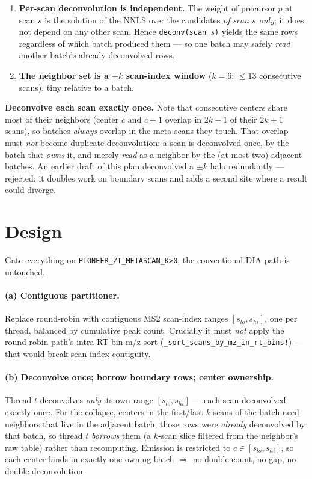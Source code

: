\documentclass[11pt]{article}
\newcommand{\code}[1]{\texttt{\small #1}}
\begin{document}
\begin{enumerate}[nosep]
  \item \textbf{Per-scan deconvolution is independent.} The weight of precursor $p$ at
    scan $s$ is the solution of the NNLS over the candidates \emph{of scan $s$ only};
    it does not depend on any other scan. Hence \code{deconv(scan $s$)} yields the same
    rows regardless of which batch produced them --- so one batch may safely \emph{read}
    another batch's already-deconvolved rows.
  \item \textbf{The neighbor set is a $\pm k$ scan-index window} ($k=6$; $\le 13$
    consecutive scans), tiny relative to a batch.
\end{enumerate}

\medskip\noindent\textbf{Deconvolve each scan exactly once.} Note that consecutive centers
share most of their neighbors (center $c$ and $c{+}1$ overlap in $2k{-}1$ of their $2k{+}1$
scans), so batches \emph{always} overlap in the meta-scans they touch. That overlap must
\emph{not} become duplicate deconvolution: a scan is deconvolved once, by the batch that
\emph{owns} it, and merely \emph{read} as a neighbor by the (at most two) adjacent batches.
An earlier draft of this plan deconvolved a $\pm k$ halo redundantly --- rejected: it doubles
work on boundary scans and adds a second site where a result could diverge.

\section{Design}
Gate everything on \code{PIONEER\_ZT\_METASCAN\_K>0}; the conventional-DIA path is untouched.

\paragraph{(a) Contiguous partitioner.} Replace round-robin with contiguous MS2
scan-index ranges $[s_{lo}, s_{hi}]$, one per thread, balanced by cumulative peak count.
Crucially it must \emph{not} apply the round-robin path's intra-RT-bin m/z sort
(\code{\_sort\_scans\_by\_mz\_in\_rt\_bins!}) --- that would break scan-index contiguity.

\paragraph{(b) Deconvolve once; borrow boundary rows; center ownership.} Thread $t$
deconvolves \emph{only} its own range $[s_{lo}, s_{hi}]$ --- each scan deconvolved exactly
once. For the collapse, centers in the first/last $k$ scans of the batch need neighbors that
live in the adjacent batch; those rows were \emph{already} deconvolved by that batch, so
thread $t$ \emph{borrows} them (a $k$-scan slice filtered from the neighbor's raw table) rather
than recomputing. Emission is restricted to $c \in [s_{lo}, s_{hi}]$, so each center lands in
exactly one owning batch $\Rightarrow$ no double-count, no gap, no double-deconvolution.
\end{document}
